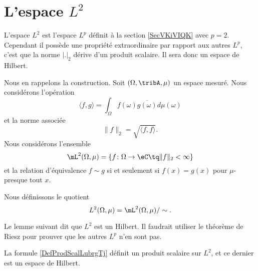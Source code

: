 \section{L'espace \texorpdfstring{$L^2$}{$L^2$}}
\label{SECooEVZSooLtLhUm}

L'espace \( L^2\) est l'espace \( L^p\) définit à la section \ref{SecVKiVIQK} avec \( p=2\). Cependant il possède une propriété extraordinaire par rapport aux autres \( L^p\), c'est que la norme \( | . |_2\) dérive d'un produit scalaire. Il sera donc un espace de Hilbert.

Nous en rappelons la construction. Soit \( (\Omega,\tribA,\mu)\) un espace mesuré. Nous considérons l'opération
\begin{equation}    \label{DefProdScalLubrgTj}
    \langle f, g\rangle =\int_{\Omega}f(\omega)\overline{ g(\omega)}d\mu(\omega)
\end{equation}
et la norme associée
\begin{equation}
    \| f \|_2=\sqrt{\langle f, f\rangle }.
\end{equation}
Nous considérons l'ensemble
\begin{equation}
    \mL^2(\Omega,\mu)=\{ f\colon \Omega\to \eC\tq \| f \|_2<\infty \}
\end{equation}
et la relation d'équivalence \( f\sim g\) si et seulement si \( f(x)=g(x)\) pour \( \mu\)-presque tout \( x\).

\begin{definition}      \label{DEFooSVCHooIwwuIx}
    Nous définissons le quotient
    \begin{equation}
        L^2(\Omega,\mu)=\mL^2(\Omega,\mu)/\sim.
    \end{equation}
\end{definition}

\begin{probleme}    \label{PROBooIQDCooMElMKg}
    Le lemme suivant dit que \( L^2\) est un Hilbert. Il faudrait utiliser le théorème de Riesz pour prouver que les autres \( L^p\) n'en sont pas.
\end{probleme}

\begin{lemma}   \label{LemIVWooZyWodb}
    La formule \eqref{DefProdScalLubrgTj} définit un produit scalaire sur \( L^2\), et ce dernier est un espace de Hilbert.
\end{lemma}

